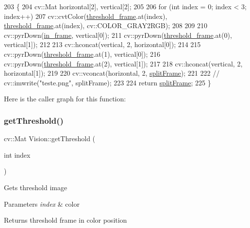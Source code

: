 \begin{DoxyCode}
203                             \{
204     cv::Mat horizontal[2], vertical[2];
205 
206     \textcolor{keywordflow}{for} (\textcolor{keywordtype}{int} index = 0; index < 3; index++)
207         cv::cvtColor(\hyperlink{class_vision_a2fee2db2d4fe0cee6b2de36ee0eb6c7f}{threshold\_frame}.at(index), \hyperlink{class_vision_a2fee2db2d4fe0cee6b2de36ee0eb6c7f}{threshold\_frame}.at(index), 
      cv::COLOR\_GRAY2RGB);
208 
209 
210     cv::pyrDown(\hyperlink{class_vision_a905e6a0333e4931dfd2e0e44b07b51c9}{in\_frame}, vertical[0]);
211     cv::pyrDown(\hyperlink{class_vision_a2fee2db2d4fe0cee6b2de36ee0eb6c7f}{threshold\_frame}.at(0), vertical[1]);
212 
213     cv::hconcat(vertical, 2, horizontal[0]);
214 
215     cv::pyrDown(\hyperlink{class_vision_a2fee2db2d4fe0cee6b2de36ee0eb6c7f}{threshold\_frame}.at(1), vertical[0]);
216     cv::pyrDown(\hyperlink{class_vision_a2fee2db2d4fe0cee6b2de36ee0eb6c7f}{threshold\_frame}.at(2), vertical[1]);
217 
218     cv::hconcat(vertical, 2, horizontal[1]);
219 
220     cv::vconcat(horizontal, 2, \hyperlink{class_vision_a5099dad8e3d8cb0ec58083a47a4171a8}{splitFrame});
221 
222     \textcolor{comment}{// cv::imwrite("teste.png", splitFrame);}
223 
224     \textcolor{keywordflow}{return} \hyperlink{class_vision_a5099dad8e3d8cb0ec58083a47a4171a8}{splitFrame};
225 \}
\end{DoxyCode}
Here is the caller graph for this function\+:
\mbox{\label{class_vision_a8dbf66a10209a8c92480b303e1eac3de}} 
\subsubsection{\texorpdfstring{get\+Threshold()}{getThreshold()}}
{\footnotesize\ttfamily cv\+::\+Mat Vision\+::get\+Threshold (\begin{DoxyParamCaption}\item[{int}]{index }\end{DoxyParamCaption})}

Gets threshold image 
\begin{DoxyParams}{Parameters}
{\em index} & color \\
\hline
\end{DoxyParams}
\begin{DoxyReturn}{Returns}
threshold frame in color position 
\end{DoxyReturn}


